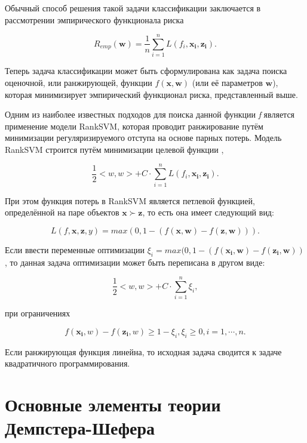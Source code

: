 \documentclass[12pt,a4paper,oneside]{article}
\begin{document}
\par
Обычный способ решения такой задачи классификации заключается в рассмотрении эмпирического функционала риска

\[
R_{emp}(\mathbf{w}) = \frac{1}{n} \sum \limits_{i=1}^n L(f_i, \mathbf{x_i}, \mathbf{z_i}).
\]

Теперь задача классификации может быть сформулирована как задача поиска оценочной, или ранжирующей, функции \(f(\mathbf{x}, \mathbf{w})\) (или её параметров \(\mathbf{w}\)), которая минимизирует эмпирический функционал риска, представленный выше. 

\par
Одним из наиболее известных подходов для поиска данной функции \emph{f} является применение модели RankSVM, которая проводит ранжирование путём минимизации регуляризируемого отступа на основе парных потерь. 
Модель RankSVM строится путём минимизации целевой функции , 

\[
\frac{1}{2} <w, w> + C \cdot \sum \limits_{i=1}^n L(f_i, \mathbf{x_i}, \mathbf{z_i}).
\] 

При этом функция потерь в RankSVM является петлевой функцией, определённой на паре объектов \(\mathbf{x} \succ \mathbf{z}\), то есть она имеет следующий вид:

\[
L(f, \mathbf{x}, \mathbf{z}, y) = max(0, 1 - (f(\mathbf{x}, \mathbf{w}) - f(\mathbf{z}, \mathbf{w}))).
\]

Если ввести переменные оптимизации \(\xi_i = max(0, 1 - (f(\mathbf{x_i}, \mathbf{w}) - f(\mathbf{z_i}, \mathbf{w}))\), то данная задача оптимизации может быть переписана в другом виде:

\[
\frac{1}{2}<w, w> + C \cdot \sum \limits_{i=1}^n \xi_i,
\]

при ограничениях

\[
f(\mathbf{x_i}, w) - f(\mathbf{z_i}, w) \geq 1 - \xi_i, 
\xi_i \geq 0, i = 1, \cdots, n.
\]

Если ранжирующая функция линейна, то исходная задача сводится к задаче квадратичного программирования.


\section{Основные элементы теории Демпстера-Шефера}
\label{sec:dst_definitions}
\end{document}
